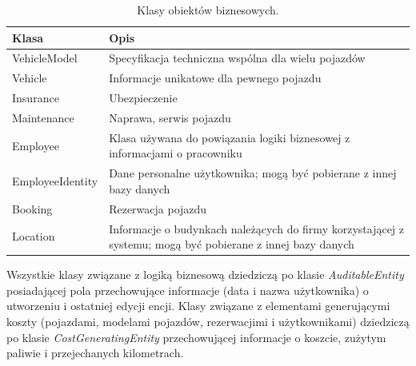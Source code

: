 \documentclass[eng,printmode,openany]{mgr}
\begin{document}
	\begin{table}[H]
		\caption{Klasy obiektów biznesowych.}
		\begin{tabularx}{\textwidth}{|l|X|}
			\hline
			\textbf{Klasa}   & \textbf{Opis}                                                                                              \\ \hline
			VehicleModel     & Specyfikacja techniczna wspólna dla wielu pojazdów                                                         \\ \hline
			Vehicle          & Informacje unikatowe dla pewnego pojazdu                                                                   \\ \hline
			Insurance        & Ubezpieczenie                                                                                              \\ \hline
			Maintenance      & Naprawa, serwis pojazdu                                                                                    \\ \hline
			Employee         & Klasa używana do powiązania logiki biznesowej z informacjami o pracowniku                                  \\ \hline
			EmployeeIdentity & Dane personalne użytkownika; mogą być pobierane z innej bazy danych                                        \\ \hline
			Booking          & Rezerwacja pojazdu                                                                                         \\ \hline
			Location         & Informacje o budynkach należących do firmy korzystającej z systemu; mogą być pobierane z innej bazy danych \\ \hline
		\end{tabularx}
	\end{table}

	Wszystkie klasy związane z logiką biznesową dziedziczą po klasie \textit{AuditableEntity} posiadającej pola przechowujące informacje (data i nazwa użytkownika) o utworzeniu i ostatniej edycji encji. Klasy związane z elementami generującymi koszty (pojazdami, modelami pojazdów, rezerwacjimi i użytkownikami) dziedziczą po klasie \textit{CostGeneratingEntity} przechowującej informacje o koszcie, zużytym paliwie i przejechanych kilometrach. 

	

	
	
\end{document}
